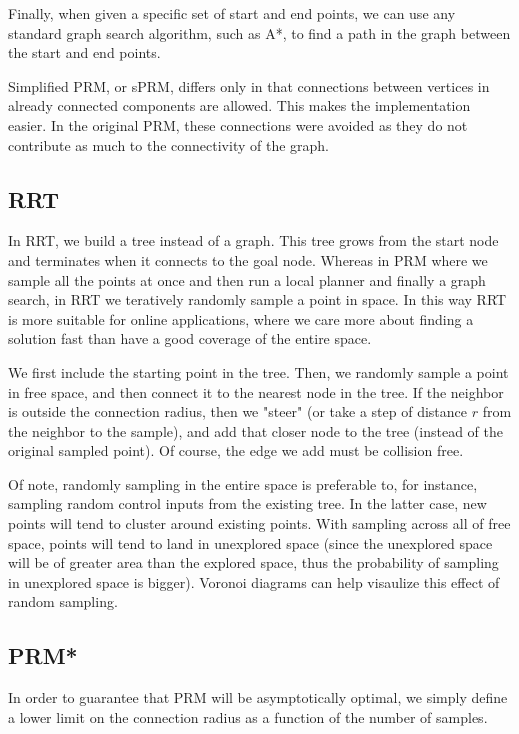 \documentclass[a4paper]{article}
\begin{document}
Finally, when given a specific set of start and end points, we can use any
standard graph search algorithm, such as A*, to find a path in the graph between
the start and end points.

Simplified PRM, or sPRM, differs only in that connections between vertices in
already connected components are allowed. This makes the implementation easier.
In the original PRM, these connections were avoided as they do not contribute as
much to the connectivity of the graph.

\subsection{RRT}

In RRT, we build a tree instead of a graph. This tree grows from the start node
and terminates when it connects to the goal node. Whereas in PRM where we sample
all the points at once and then run a local planner and finally a graph search,
in RRT we teratively randomly sample a point in space. In this way RRT is more
suitable for online applications, where we care more about finding a solution
fast than have a good coverage of the entire space.

We first include the starting point in the tree. Then, we randomly sample a
point in free space, and then connect it to the nearest node in the tree. If the
neighbor is outside the connection radius, then we "steer" (or take a step of
distance $r$ from the neighbor to the sample), and add that closer node to the tree
(instead of the original sampled point). Of course, the edge we add must be
collision free. 

Of note, randomly sampling in the entire space is preferable to, for instance,
sampling random control inputs from the existing tree. In the latter case, new
points will tend to cluster around existing points. With sampling across all of
free space, points will tend to land in unexplored space (since the unexplored
space will be of greater area than the explored space, thus the probability of
sampling in unexplored space is bigger). Voronoi diagrams can help visaulize
this effect of random sampling. 


\subsection{PRM*}

In order to guarantee that PRM will be asymptotically optimal, we simply define
a lower limit on the connection radius as a function of the number of samples.
\end{document}
